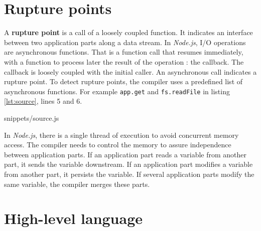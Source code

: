 \section{Rupture points} \label{section:rupture}

A \textbf{rupture point} is a call of a loosely coupled function.
It indicates an interface between two application parts along a data stream.
In \textit{Node.js}, I/O operations are asynchronous functions.
That is a function call that resumes immediately, with a function to process later the result of the operation : the callback.
The callback is loosely coupled with the initial caller.
An asynchronous call indicates a rupture point.
To detect rupture points, the compiler uses a predefined list of asynchronous functions.
For example \texttt{app.get} and \texttt{fs.readFile} in listing \ref{lst:source}, lines 5 and 6.

{snippets/source.js}

In \textit{Node.js}, there is a single thread of execution to avoid concurrent memory access.
The compiler needs to control the memory to assure independence between application parts.
If an application part reads a variable from another part, it sends the variable downstream.
If an application part modifies a variable from another part, it persists the variable.
If several application parts modify the same variable, the compiler merges these parts.

\section{High-level language} \label{section:language}

